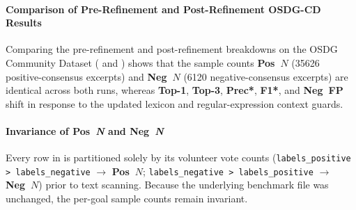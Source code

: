 \paragraph{Comparison of Pre-Refinement and Post-Refinement OSDG-CD Results}
\label{sec:osdg_cd_pre_post_comparison}

Comparing the pre-refinement and post-refinement breakdowns on the OSDG Community Dataset ( and ) shows that the sample counts \textbf{Pos~$N$} (\num{35626} positive-consensus excerpts) and \textbf{Neg~$N$} (\num{6120} negative-consensus excerpts) are identical across both runs, whereas \textbf{Top-1}, \textbf{Top-3}, \textbf{Prec*}, \textbf{F1*}, and \textbf{Neg~FP} shift in response to the updated lexicon and regular-expression context guards.

\paragraph{Invariance of \textbf{Pos~\textit{N}} and \textbf{Neg~\textit{N}}}

Every row in  is partitioned solely by its volunteer vote counts (\texttt{labels\_positive > labels\_negative} $\rightarrow$ \textbf{Pos~$N$}; \texttt{labels\_negative > labels\_positive} $\rightarrow$ \textbf{Neg~$N$}) prior to text scanning. Because the underlying benchmark file was unchanged, the per-goal sample counts remain invariant.

